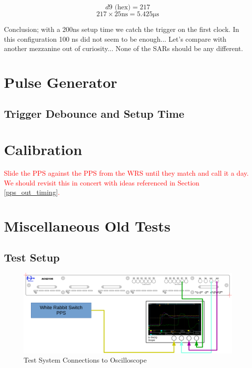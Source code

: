 \documentclass[]{article}
\begin{document}
\[	d9\textrm{ (hex)}= 217	\]
\[	217 \times 25 \si{\ns} = 5.425\si{\us}	\]

Conclusion; with a 200ns setup time we catch the trigger on the first clock. In this configuration 100 ns did not seem to be enough... Let's compare with another mezzanine out of curiosity... None of the SARs should be any different.


\section{Pulse Generator}
\subsection{Trigger Debounce and Setup Time}

\section{Calibration}
\textcolor{red}{Slide the PPS against the PPS from the WRS until they match and call it a day. We should revisit this in concert with ideas referenced in Section \ref{pps_out_timing}.}

%
%

\section{Miscellaneous Old Tests}
\subsection{Test Setup}

\begin{figure}[H]
	\centering
	\includegraphics[height=0.4\textwidth]{images/system_diag}
	\caption{Test System Connections to Oscilloscope}
	\label{fig:sys_diag}
\end{figure}
\end{document}
